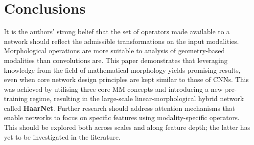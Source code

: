 \documentclass{article}
\begin{document}
\section{Conclusions} \label{sec:conclusions}
It is the authors' strong belief that the set of operators made available to a network should reflect the admissible transformations on the input modalities.
Morphological operations are more suitable to analysis of geometry-based modalities than convolutions are.
This paper demonstrates that leveraging knowledge from the field of mathematical morphology yields promising results, even when core network design principles are kept similar to those of CNNs.
This was achieved by utilising three core MM concepts and introducing a new pre-training regime, resulting in the large-scale linear-morphological hybrid network called \textbf{HaarNet}.
Further research should address attention mechanisms that enable networks to focus on specific features using modality-specific operators.
This should be explored both across scales and along feature depth; the latter has yet to be investigated in the literature.

{\small


}
\end{document}
